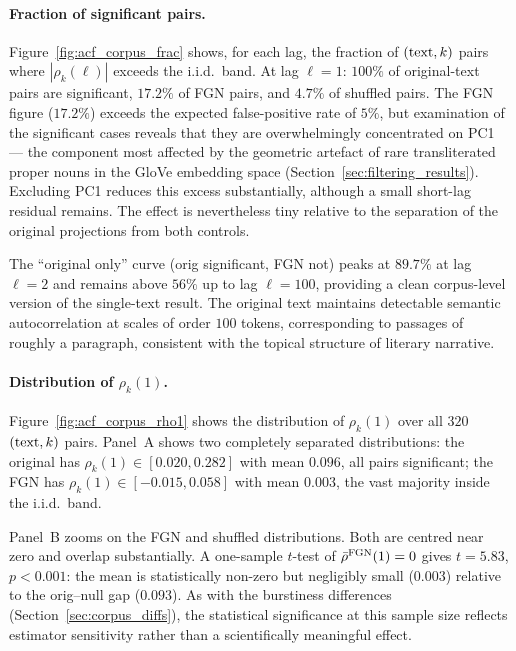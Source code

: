 \documentclass[12pt,a4paper]{article}
\begin{document}
\paragraph{Fraction of significant pairs.}
Figure~\ref{fig:acf_corpus_frac} shows, for each lag, the fraction of
$({\rm text}, k)$ pairs where $|\rho_k(\ell)|$ exceeds the i.i.d.\
band.
At lag $\ell = 1$: $100\%$ of original-text pairs are significant,
$17.2\%$ of FGN pairs, and $4.7\%$ of shuffled pairs.
The FGN figure ($17.2\%$) exceeds the expected false-positive rate
of $5\%$, but examination of the significant cases reveals that
they are overwhelmingly concentrated on PC1 --- the component most
affected by the geometric artefact of rare transliterated proper nouns
in the GloVe embedding space (Section~\ref{sec:filtering_results}).
Excluding PC1 reduces this excess substantially, although a small
short-lag residual remains. The effect is nevertheless tiny relative
to the separation of the original projections from both controls.

The ``original only'' curve (orig significant, FGN not) peaks at
$89.7\%$ at lag $\ell = 2$ and remains above $56\%$ up to lag
$\ell = 100$, providing a clean corpus-level version of the
single-text result.
The original text maintains detectable semantic autocorrelation
at scales of order $100$ tokens, corresponding to passages of
roughly a paragraph, consistent with the topical structure of
literary narrative.

\paragraph{Distribution of $\rho_k(1)$.}
Figure~\ref{fig:acf_corpus_rho1} shows the distribution of
$\rho_k(1)$ over all $320$ $({\rm text}, k)$ pairs.
Panel~A shows two completely separated distributions: the original
has $\rho_k(1) \in [0.020, 0.282]$ with mean $0.096$, all
pairs significant; the FGN has $\rho_k(1) \in [-0.015, 0.058]$
with mean $0.003$, the vast majority inside the i.i.d.\ band.

Panel~B zooms on the FGN and shuffled distributions.
Both are centred near zero and overlap substantially.
A one-sample $t$-test of $\bar\rho^{\rm FGN}(1) = 0$ gives
$t = 5.83$, $p < 0.001$: the mean is statistically non-zero but
negligibly small ($0.003$) relative to the orig--null gap ($0.093$).
As with the burstiness differences (Section~\ref{sec:corpus_diffs}),
the statistical significance at this sample size reflects estimator
sensitivity rather than a scientifically meaningful effect.
\end{document}
